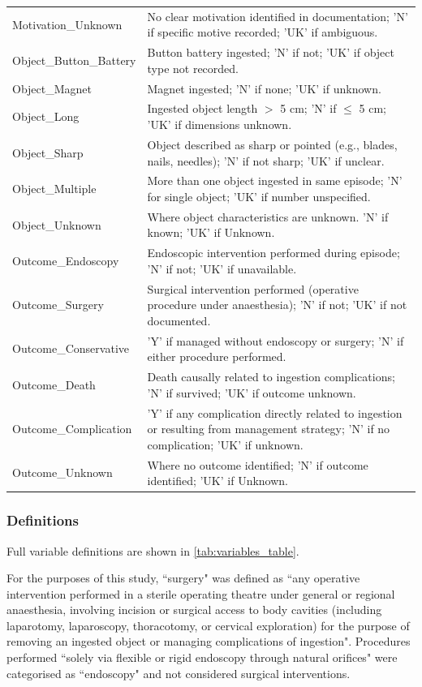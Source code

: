 \begin{appendices}
\begin{table}[h]
\begin{tabular}{p{4cm} p{11cm}}
Motivation\_Unknown & No clear motivation identified in documentation; 'N' if specific motive recorded; 'UK' if ambiguous. \\
Object\_Button\_Battery & Button battery ingested; 'N' if not; 'UK' if object type not recorded. \\
Object\_Magnet & Magnet ingested; 'N' if none; 'UK' if unknown. \\
Object\_Long & Ingested object length $>$ 5 cm; 'N' if $\leq$ 5 cm; 'UK' if dimensions unknown. \\
Object\_Sharp & Object described as sharp or pointed (e.g., blades, nails, needles); 'N' if not sharp; 'UK' if unclear. \\
Object\_Multiple & More than one object ingested in same episode; 'N' for single object; 'UK' if number unspecified. \\
Object\_Unknown & Where object characteristics are unknown. 'N' if known; 'UK' if Unknown. \\
Outcome\_Endoscopy & Endoscopic intervention performed during episode; 'N' if not; 'UK' if unavailable. \\
Outcome\_Surgery & Surgical intervention performed (operative procedure under anaesthesia); 'N' if not; 'UK' if not documented. \\
Outcome\_Conservative & 'Y' if managed without endoscopy or surgery; 'N' if either procedure performed. \\
Outcome\_Death & Death causally related to ingestion complications; 'N' if survived; 'UK' if outcome unknown. \\
Outcome\_Complication & 'Y' if any complication directly related to ingestion or resulting from management strategy; 'N' if no complication; 'UK' if unknown. \\
Outcome\_Unknown & Where no outcome identified; 'N' if outcome identified; 'UK' if Unknown. \\
\bottomrule
\end{tabular}
\end{table}

\subsubsection{Definitions}
Full variable definitions are shown in \ref{tab:variables_table}.

For the purposes of this study, ``surgery" was defined as ``any operative intervention performed in a sterile operating theatre under general or regional anaesthesia, involving incision or surgical access to body cavities (including laparotomy, laparoscopy, thoracotomy, or cervical exploration) for the purpose of removing an ingested object or managing complications of ingestion". Procedures performed ``solely via flexible or rigid endoscopy through natural orifices" were categorised as ``endoscopy" and not considered surgical interventions.


\end{appendices}

